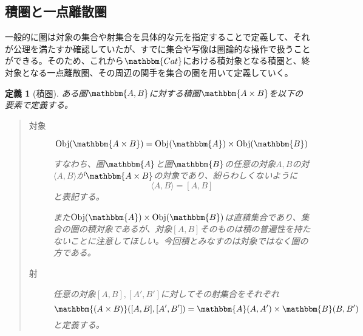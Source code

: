 \documentclass[uplatex,dvipdfmx]{jsarticle}
\newcommand{\cat}[1]{\mathbbm{#1}}
\newcommand{\tuple}[1]{\langle #1\rangle}
\newcommand{\obj}[1]{\mathrm{Obj}(\cat{#1})}
\newcommand{\arset}[3]{\cat{#1}(#2,#3)}
\newcommand{\pcobj}[1]{[#1]}
\newtheorem{define}{定義}[section]
\numberwithin{proof}{subsection}
\numberwithin{prop}{subsection}
\numberwithin{define}{subsection}
\begin{document}
	\subsection{積圏と一点離散圏}
  一般的に圏は対象の集合や射集合を具体的な元を指定することで定義して、それが公理を満たすか確認していたが、すでに集合や写像は圏論的な操作で扱うことができる。そのため、これから$\cat{Cat}$における積対象となる積圏と、終対象となる一点離散圏、その周辺の関手を集合の圏を用いて定義していく。
	\begin{define}[積圏]
		ある圏$\cat{A,B}$に対する積圏$\cat{A\times B}$を以下の要素で定義する。
		\begin{quote}
			\begin{description}
				\item[対象] \[\obj{A\times B}=\obj{A}\times\obj{B}\]

				すなわち、圏$\cat{A}$と圏$\cat{B}$の任意の対象$A,B$の対$\tuple{A,B}$が$\cat{A\times B}$の対象であり、紛らわしくないように\[\tuple{A,B}=\pcobj{A,B}\]と表記する。

				また$\obj{A}\times\obj{B}$は直積集合であり、集合の圏の積対象であるが、対象$\pcobj{A,B}$そのものは積の普遍性を持たないことに注意してほしい。今回積とみなすのは対象ではなく圏の方である。
				\item[射]任意の対象$\pcobj{A,B},\pcobj{A',B'}$に対してその射集合をそれぞれ\[\arset{(A\times B)}{\pcobj{A,B}}{\pcobj{A',B'}}=\arset{A}{A}{A'}\times\arset{B}{B}{B'}\]と定義する。


\end{description}
\end{quote}
\end{define}
\end{document}
